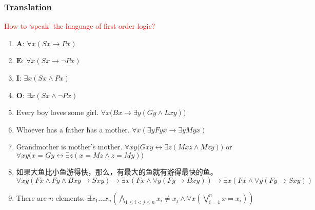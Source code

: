 \documentclass[UTF8,11pt,colorlinks,compress,openany]{beamer}%
\begin{document}
\begin{frame}\frametitle{Translation}
		\begin{block}{}
			\centering\textcolor{red}{How to `speak' the language of first order logic?}
		\end{block}
		\begin{enumerate}
			\item $\mathbf{A}$: $\forall x(Sx\to Px)$
			\item $\mathbf{E}$: $\forall x(Sx\to \neg Px)$
			\item $\mathbf{I}$: $\exists x(Sx\wedge Px)$
			\item $\mathbf{O}$: $\exists x(Sx\wedge \neg Px)$
			\item Every boy loves some girl. $\forall x\big(Bx\to\exists y(Gy\wedge Lxy)\big)$
			\item Whoever has a father has a mother. $\forall x(\exists y Fyx\to\exists y Myx)$
			\item Grandmother is mother's mother.
			$\forall xy\big(Gxy\leftrightarrow\exists z(Mxz\wedge Mzy)\big)$ or
			$\forall xy\big(x=Gy\leftrightarrow\exists z(x=Mz\wedge z=My)\big)$
			\item 如果大鱼比小鱼游得快，那么，有最大的鱼就有游得最快的鱼。\\
			$\forall xy(Fx\wedge Fy\wedge Bxy\to Sxy)\to\exists x(Fx\wedge\forall y(Fy\to Bxy))\to\exists x(Fx\wedge\forall y(Fy\to Sxy))$
			\item There are $n$ elements.
			$\exists x_1\dots x_n\left(\bigwedge\limits_{1\leq i<j\leq n}x_i\ne x_j\wedge\forall x\left(\bigvee\limits_{i=1}^n x=x_i\right)\right)$
		\end{enumerate}
\end{frame}
\end{document}
